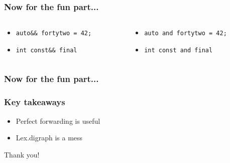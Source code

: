 \documentclass[aspectratio=169]{beamer}
\begin{document}
\begin{frame}[fragile]
\frametitle{Now for the fun part...}
\begin{columns}
  \begin{column}{0.5\textwidth}
    \begin{itemize}
      \item \texttt{auto\&\& fortytwo = 42;}
      \vspace{2em}
      \item \texttt{int const\&\& final}
    \end{itemize}
  \end{column}
  \begin{column}{0.5\textwidth}
    \begin{itemize}
      \item \texttt{auto and fortytwo = 42;}
      \vspace{2em}
      \item \texttt{int const and final}
    \end{itemize}
  \end{column}
\end{columns}
\end{frame}


\begin{frame}[fragile]
\frametitle{Now for the fun part...}
  {\fontsize{3}{4} }
\end{frame}


\begin{frame}
\frametitle{Key takeaways}
{\centering
\begin{itemize}
  \item Perfect forwarding is useful
  \item Lex.digraph is a mess
\end{itemize}

\vspace{2ex}
\begin{center}{\Large Thank you!}\end{center}
}
\end{frame}
\end{document}
